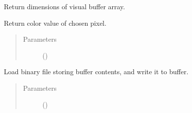 \documentclass[letterpaper,10pt,english,openany,oneside]{sphinxmanual}
\begin{document}
\begin{fulllineitems}
\begin{fulllineitems}
\end{fulllineitems}


\begin{fulllineitems}
\label{\detokenize{dpav:dpav.vbuffer.VBuffer.get_dimensions}}
\sphinxAtStartPar
Return dimensions of visual buffer array.

\end{fulllineitems}


\begin{fulllineitems}
\label{\detokenize{dpav:dpav.vbuffer.VBuffer.get_pixel}}
\sphinxAtStartPar
Return color value of chosen pixel.
\begin{quote}\begin{description}
\item[{Parameters}] \leavevmode
\sphinxAtStartPar
{} () \textendash{} 

\end{description}\end{quote}

\end{fulllineitems}


\begin{fulllineitems}
\label{\detokenize{dpav:dpav.vbuffer.VBuffer.load_buffer_from_file}}
\sphinxAtStartPar
Load binary file storing buffer contents, and write it to buffer.
\begin{quote}\begin{description}
\item[{Parameters}] \leavevmode
\sphinxAtStartPar
{} () \textendash{} 


\end{description}
\end{quote}
\end{fulllineitems}
\end{fulllineitems}
\end{document}
